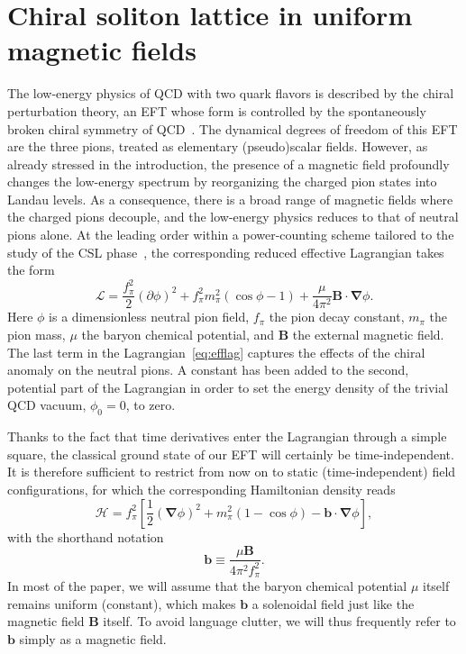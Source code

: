 \documentclass[pdflatex,iicol,sn-mathphys-num]{sn-jnl}
\let\m=\mu
\let\p=\phi
\let\de=\partial
\newcommand{\Ha}{\mathscr{H}}%
\newcommand{\La}{\mathscr{L}}%
\newcommand{\vek}[1]{\bm{#1}}%
\newcommand{\grad}{\vek\nabla}%
\newcommand{\bmag}{b}%
\begin{document}

\section{Chiral soliton lattice in uniform magnetic fields}
\label{sec:uniformB}

The low-energy physics of QCD with two quark flavors is described by the chiral perturbation theory, an EFT whose form is controlled by the spontaneously broken chiral symmetry of QCD~\cite{Scherer2012a}. The dynamical degrees of freedom of this EFT are the three pions, treated as elementary (pseudo)scalar fields. However, as already stressed in the introduction, the presence of a magnetic field profoundly changes the low-energy spectrum by reorganizing the charged pion states into Landau levels. As a consequence, there is a broad range of magnetic fields where the charged pions decouple, and the low-energy physics reduces to that of neutral pions alone. At the leading order within a power-counting scheme tailored to the study of the CSL phase~\cite{Brauner:2021sci}, the corresponding reduced effective Lagrangian takes the form
\begin{equation}
\La=\frac{f_\pi^2}{2}(\de\p)^2+f_\pi^2m_\pi^2(\cos\p-1)+\frac\m{4\pi^2}\vek B\cdot\grad\p.
\label{eq:efflag}
\end{equation}
Here $\p$ is a dimensionless neutral pion field, $f_\pi$ the pion decay constant, $m_\pi$ the pion mass, $\m$ the baryon chemical potential, and $\vek B$ the external magnetic field. The last term in the Lagrangian~\eqref{eq:efflag} captures the effects of the chiral anomaly on the neutral pions. A constant has been added to the second, potential part of the Lagrangian in order to set the energy density of the trivial QCD vacuum, $\p_0=0$, to zero.

Thanks to the fact that time derivatives enter the Lagrangian through a simple square, the classical ground state of our EFT will certainly be time-independent. It is therefore sufficient to restrict from now on to static (time-independent) field configurations, for which the corresponding Hamiltonian density reads
\begin{equation}
\Ha=f_\pi^2\left[\frac12(\grad\p)^2+m_\pi^2(1-\cos\p)-\vek\bmag\cdot\grad\p\right],
\label{eq:effham}
\end{equation}
with the shorthand notation
\begin{equation}
\vek\bmag\equiv\frac{\m\vek B}{4\pi^2f_\pi^2}.
\label{eq:defH}
\end{equation}
In most of the paper, we will assume that the baryon chemical potential $\m$ itself remains uniform (constant), which makes $\vek\bmag$ a solenoidal field just like the magnetic field $\vek B$ itself. To avoid language clutter, we will thus frequently refer to $\vek\bmag$ simply as a magnetic field.
\end{document}
